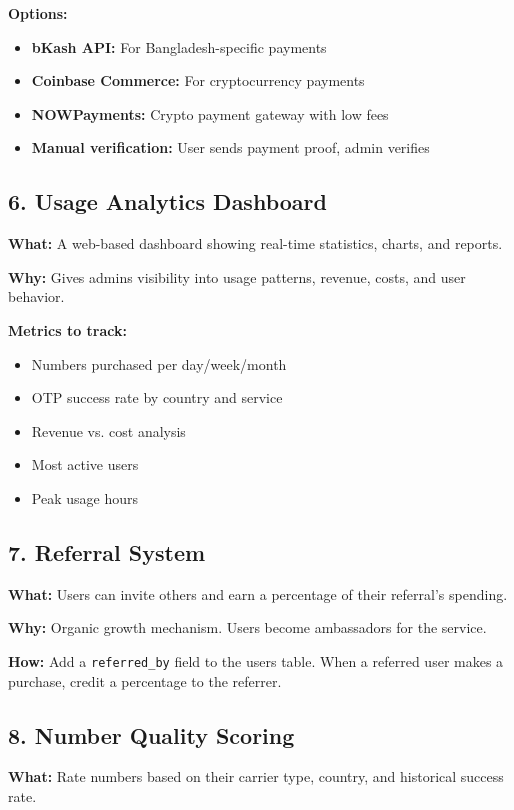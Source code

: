 \textbf{Options:}
\begin{itemize}
    \item \textbf{bKash API:} For Bangladesh-specific payments
    \item \textbf{Coinbase Commerce:} For cryptocurrency payments
    \item \textbf{NOWPayments:} Crypto payment gateway with low fees
    \item \textbf{Manual verification:} User sends payment proof, admin verifies
\end{itemize}

\subsection{6. Usage Analytics Dashboard}

\textbf{What:} A web-based dashboard showing real-time statistics, charts, and reports.

\textbf{Why:} Gives admins visibility into usage patterns, revenue, costs, and user behavior.

\textbf{Metrics to track:}
\begin{itemize}
    \item Numbers purchased per day/week/month
    \item OTP success rate by country and service
    \item Revenue vs. cost analysis
    \item Most active users
    \item Peak usage hours
\end{itemize}

\subsection{7. Referral System}

\textbf{What:} Users can invite others and earn a percentage of their referral's spending.

\textbf{Why:} Organic growth mechanism. Users become ambassadors for the service.

\textbf{How:} Add a \texttt{referred\_by} field to the users table. When a referred user makes a purchase, credit a percentage to the referrer.

\subsection{8. Number Quality Scoring}

\textbf{What:} Rate numbers based on their carrier type, country, and historical success rate.


